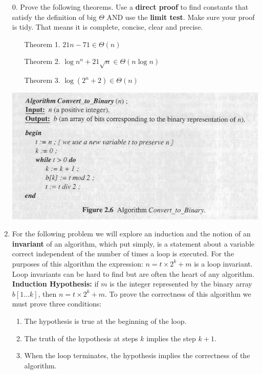 \documentclass[12pt]{article}
\begin{document}
\begin{enumerate}
\item[0. ] Prove the following theorems. Use a \textbf{direct proof} to find constants 
that satisfy the definition of big $\Theta$ AND use the \textbf{limit test}. Make sure your 
proof is tidy. That means it is complete, concise, clear and precise.
\begin{enumerate}
\item[Theorem 1.] $21n - 71 \in \Theta(n)$
\item[Theorem 2.] $\log{n^n} + 21 \sqrt{n} \in \Theta(n\log{n})$
\item[Theorem 3.] $\log{(2^n+2)} \in \Theta(n)$
\end{enumerate}
\newpage
\centerline{\includegraphics[scale = 0.6]{algo.jpg}}
\item For the following problem we will explore an induction and the
notion of an \textbf{invariant} of an algorithm, which put simply, is a statement about
a variable correct independent of the number of times a loop is executed. For the purposes of 
this algorithm the expression: $n = t \times 2^k + m$ is a loop invariant. Loop invariants can 
be hard to find but are often the heart of any algorithm.\\
\textbf{Induction Hypothesis: } if $m$ is the integer represented by 
the binary array $b[1\dots k]$, then $n = t \times 2^k + m$. To prove the 
correctness of this algorithm we must prove three conditions:
\begin{enumerate}
\item The hypothesis is true at the beginning of the loop.
\item The truth of the hypothesis at steps $k$ implies the step $k+1$.
\item When the loop terminates, the hypothesis implies the correctness of the algorithm.
\end{enumerate}

\end{enumerate}
\end{document}
